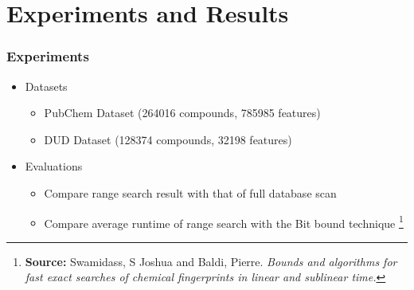 \documentclass{beamer}
\begin{document}
\section{Experiments and Results}
\begin{frame}
\frametitle{Experiments}
\begin{itemize}
\item<1-> Datasets
\begin{itemize}
	\item PubChem Dataset (264016 compounds, 785985 features)
	\item DUD Dataset (128374 compounds, 32198 features)
\end{itemize}

\item<1-> Evaluations
\begin{itemize}
	\item Compare range search result with that of full database scan
	\item Compare average runtime of range search with the Bit bound technique 
\footnote{\textbf{Source:} Swamidass, S Joshua and Baldi, Pierre. \textit{Bounds and algorithms for fast exact searches of chemical fingerprints in linear and sublinear time.}} 
\end{itemize} 
\end{itemize}

\end{frame}

\end{document}
